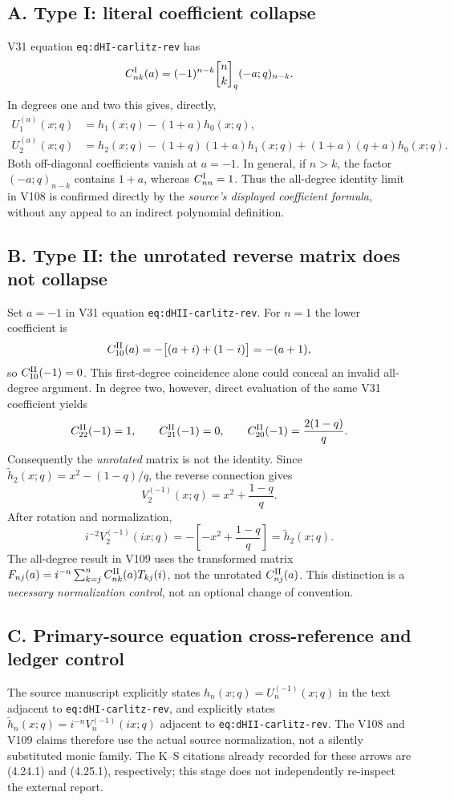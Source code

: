 \documentclass[11pt]{article}
\begin{document}
\subsection*{A. Type I: literal coefficient collapse}
V31 equation \texttt{eq:dHI-carlitz-rev} has
\[
 C^{\rm I}_{nk}(a)=(-1)^{n-k}{n\brack k}_q(-a;q)_{n-k}.
\]
In degrees one and two this gives, directly,
\begin{align*}
 U_1^{(a)}(x;q)&=h_1(x;q)-(1+a)h_0(x;q),\\
 U_2^{(a)}(x;q)&=h_2(x;q)-(1+q)(1+a)h_1(x;q)
 +(1+a)(q+a)h_0(x;q).
\end{align*}
Both off-diagonal coefficients vanish at $a=-1$. In general, if $n>k$, the factor $(-a;q)_{n-k}$ contains $1+a$, whereas $C^{\rm I}_{nn}=1$. Thus the all-degree identity limit in V108 is confirmed directly by the \emph{source's displayed coefficient formula}, without any appeal to an indirect polynomial definition.

\subsection*{B. Type II: the unrotated reverse matrix does not collapse}
Set $a=-1$ in V31 equation \texttt{eq:dHII-carlitz-rev}. For $n=1$ the lower coefficient is
\[
 C^{\rm II}_{10}(a)=-\bigl[(a+i)+(1-i)\bigr]=-(a+1),
\]
so $C^{\rm II}_{10}(-1)=0$. This first-degree coincidence alone could conceal an invalid all-degree argument. In degree two, however, direct evaluation of the same V31 coefficient yields
\[
 C^{\rm II}_{22}(-1)=1,\qquad C^{\rm II}_{21}(-1)=0,\qquad
 C^{\rm II}_{20}(-1)=\frac{2(1-q)}q.
\]
Consequently the \emph{unrotated} matrix is not the identity. Since
$\widetilde h_2(x;q)=x^2-(1-q)/q$, the reverse connection gives
\[
 V_2^{(-1)}(x;q)=x^2+\frac{1-q}{q}.
\]
After rotation and normalization,
\[
 i^{-2}V_2^{(-1)}(ix;q)=-\left[-x^2+\frac{1-q}{q}\right]
 =\widetilde h_2(x;q).
\]
The all-degree result in V109 uses the transformed matrix
$F_{nj}(a)=i^{-n}\sum_{k=j}^n C^{\rm II}_{nk}(a)T_{kj}(i)$,
not the unrotated $C^{\rm II}_{nj}(a)$. This distinction is a \emph{necessary normalization control}, not an optional change of convention.

\subsection*{C. Primary-source equation cross-reference and ledger control}
The source manuscript explicitly states $h_n(x;q)=U_n^{(-1)}(x;q)$ in the text adjacent to \texttt{eq:dHI-carlitz-rev}, and explicitly states
$\widetilde h_n(x;q)=i^{-n}V_n^{(-1)}(ix;q)$ adjacent to
\texttt{eq:dHII-carlitz-rev}. The V108 and V109 claims therefore use the actual source normalization, not a silently substituted monic family. The K--S citations already recorded for these arrows are (4.24.1) and (4.25.1), respectively; this stage does not independently re-inspect the external report.
\end{document}
